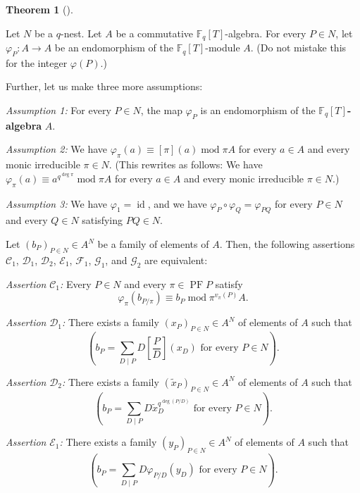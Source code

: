 \documentclass[numbers=enddot,12pt,final,onecolumn,notitlepage]{scrartcl}%
\theoremstyle{definition}
\newtheorem{theo}{Theorem}[section]
\newenvironment{theorem}[1][]
{\begin{theo}[#1]\begin{leftbar}}
{\end{leftbar}\end{theo}}
\let\sumnonlimits\sum
\renewcommand{\sum}{\sumnonlimits\limits}
\begin{document}
\begin{theorem}
\label{thm.carlitz.gW}Let $N$ be a $q$-nest. Let $A$ be a commutative
$\mathbb{F}_{q}\left[  T\right]  $-algebra. For every $P\in N$, let
$\varphi_{P}:A\rightarrow A$ be an endomorphism of the $\mathbb{F}_{q}\left[
T\right]  $-module $A$. (Do not mistake this for the integer $\varphi\left(
P\right)  $.)

Further, let us make three more assumptions:

\textit{Assumption 1:} For every $P\in N$, the map $\varphi_{P}$ is an
endomorphism of the $\mathbb{F}_{q}\left[  T\right]  $\textbf{-algebra} $A$.

\textit{Assumption 2:} We have $\varphi_{\pi}\left(  a\right)  \equiv\left[
\pi\right]  \left(  a\right)  \operatorname{mod}\pi A$ for every $a\in A$ and
every monic irreducible $\pi\in N$. (This rewrites as follows: We have
$\varphi_{\pi}\left(  a\right)  \equiv a^{q^{\deg\pi}}\operatorname{mod}\pi A$
for every $a\in A$ and every monic irreducible $\pi\in N$.)

\textit{Assumption 3:} We have $\varphi_{1}=\operatorname*{id}$, and we have
$\varphi_{P}\circ\varphi_{Q}=\varphi_{PQ}$ for every $P\in N$ and every $Q\in
N$ satisfying $PQ\in N$.

Let $\left(  b_{P}\right)  _{P\in N}\in A^{N}$ be a family of elements of $A$.
Then, the following assertions $\mathcal{C}_{1}$, $\mathcal{D}_{1}$,
$\mathcal{D}_{2}$, $\mathcal{E}_{1}$, $\mathcal{F}_{1}$, $\mathcal{G}_{1}$,
and $\mathcal{G}_{2}$ are equivalent:

\textit{Assertion }$\mathcal{C}_{1}$\textit{:} Every $P\in N$ and every
$\pi\in\operatorname{PF}P$ satisfy%
\[
\varphi_{\pi}\left(  b_{P/\pi}\right)  \equiv b_{P}\operatorname{mod}%
\pi^{v_{\pi}\left(  P\right)  }A.
\]


\textit{Assertion }$\mathcal{D}_{1}$\textit{:} There exists a family $\left(
x_{P}\right)  _{P\in N}\in A^{N}$ of elements of $A$ such that%
\[
\left(  b_{P}=\sum_{D\mid P}D\left[  \dfrac{P}{D}\right]  \left(
x_{D}\right)  \text{ for every }P\in N\right)  .
\]


\textit{Assertion }$\mathcal{D}_{2}$\textit{:} There exists a family $\left(
\widetilde{x}_{P}\right)  _{P\in N}\in A^{N}$ of elements of $A$ such that%
\[
\left(  b_{P}=\sum_{D\mid P}D\widetilde{x}_{D}^{q^{\deg\left(  P/D\right)  }%
}\text{ for every }P\in N\right)  .
\]


\textit{Assertion }$\mathcal{E}_{1}$\textit{:} There exists a family $\left(
y_{P}\right)  _{P\in N}\in A^{N}$ of elements of $A$ such that%
\[
\left(  b_{P}=\sum_{D\mid P}D\varphi_{P / D}\left(  y_{D}\right)  \text{ for
every }P\in N\right)  .
\]



\end{theorem}
\end{document}
